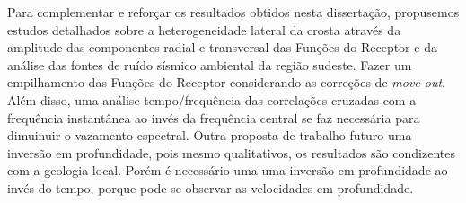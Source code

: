 Para complementar e reforçar os resultados obtidos nesta dissertação, propusemos estudos detalhados sobre a heterogeneidade lateral da crosta através da amplitude das componentes radial e transversal das Funções do Receptor e da análise das fontes de ruído sísmico ambiental da região sudeste. Fazer um empilhamento das Funções do Receptor considerando as correções de \textit{move-out}. Além disso, uma análise tempo/frequência das correlações cruzadas com a frequência instantânea ao invés da frequência central se faz necessária para dimuinuir o vazamento espectral. Outra proposta de trabalho futuro uma inversão em profundidade, pois mesmo qualitativos, os resultados são condizentes com a geologia local. Porém é necessário uma uma inversão em profundidade ao invés do tempo, porque pode-se observar as velocidades em profundidade.